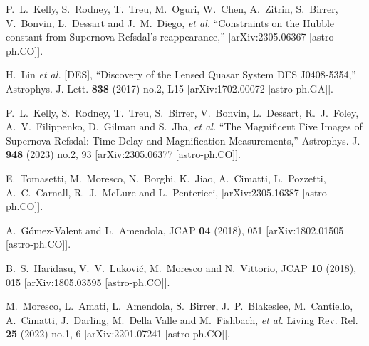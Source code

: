 \documentclass[a4paper,11pt]{article}
\begin{document}
\begin{thebibliography}{99}
P.~L.~Kelly, S.~Rodney, T.~Treu, M.~Oguri, W.~Chen, A.~Zitrin, S.~Birrer, V.~Bonvin, L.~Dessart and J.~M.~Diego, \textit{et al.}
``Constraints on the Hubble constant from Supernova Refsdal's reappearance,''
[arXiv:2305.06367 [astro-ph.CO]].

H.~Lin \textit{et al.} [DES],
``Discovery of the Lensed Quasar System DES J0408-5354,''
Astrophys. J. Lett. \textbf{838} (2017) no.2, L15
[arXiv:1702.00072 [astro-ph.GA]].

P.~L.~Kelly, S.~Rodney, T.~Treu, S.~Birrer, V.~Bonvin, L.~Dessart, R.~J.~Foley, A.~V.~Filippenko, D.~Gilman and S.~Jha, \textit{et al.}
``The Magnificent Five Images of Supernova Refsdal: Time Delay and Magnification Measurements,''
Astrophys. J. \textbf{948} (2023) no.2, 93
[arXiv:2305.06377 [astro-ph.CO]].

E.~Tomasetti, M.~Moresco, N.~Borghi, K.~Jiao, A.~Cimatti, L.~Pozzetti, A.~C.~Carnall, R.~J.~McLure and L.~Pentericci,
[arXiv:2305.16387 [astro-ph.CO]].

A.~G\'omez-Valent and L.~Amendola,
JCAP \textbf{04} (2018), 051
[arXiv:1802.01505 [astro-ph.CO]].

B.~S.~Haridasu, V.~V.~Lukovi\'c, M.~Moresco and N.~Vittorio,
JCAP \textbf{10} (2018), 015
[arXiv:1805.03595 [astro-ph.CO]].

M.~Moresco, L.~Amati, L.~Amendola, S.~Birrer, J.~P.~Blakeslee, M.~Cantiello, A.~Cimatti, J.~Darling, M.~Della Valle and M.~Fishbach, \textit{et al.}
Living Rev. Rel. \textbf{25} (2022) no.1, 6
[arXiv:2201.07241 [astro-ph.CO]].



\end{thebibliography}
\end{document}
